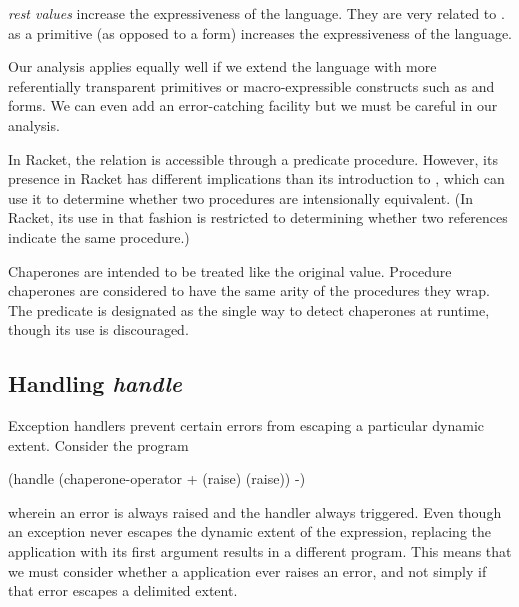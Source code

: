 \documentclass{sigplanconf}
\begin{document}
\emph{rest values} increase the expressiveness of the language. They are very related to .
 as a primitive (as opposed to a form) increases the expressiveness of the language.

Our analysis applies equally well if we extend the language with more referentially transparent primitives or macro-expressible constructs such as  and  forms.
We can even add an error-catching facility but we must be careful in our analysis.

In Racket, the  relation is accessible through a predicate procedure.
However, its presence in Racket has different implications than its introduction to \chapcalc, which can use it to determine whether two procedures are intensionally equivalent.
(In Racket, its use in that fashion is restricted to determining whether two references indicate the same procedure.)

Chaperones are intended to be treated like the original value.
Procedure chaperones are considered to have the same arity of the procedures they wrap.
The  predicate is designated as the single way to detect chaperones at runtime, though its use is discouraged.

\subsection{Handling \emph{handle}}

Exception handlers prevent certain errors from escaping a particular dynamic extent.
Consider the program
\begin{schemedisplay}
(handle
  (chaperone-operator + (raise) (raise))
  -)
\end{schemedisplay}
wherein an error is always raised and the handler always triggered.
Even though an exception never escapes the dynamic extent of the  expression, replacing the  application with its first argument results in a different program. 
This means that we must consider whether a  application ever raises an error, and not simply if that error escapes a delimited extent.
\end{document}
